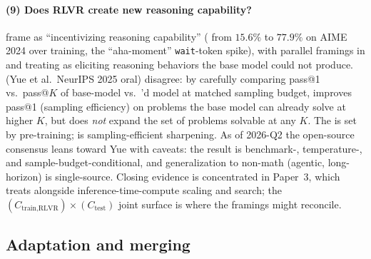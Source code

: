 \paragraph{(9) Does RLVR create new reasoning capability?}
\citet{deepseek-r1} frame  as ``incentivizing reasoning
capability'' ( from $15.6\%$ to $77.9\%$ on AIME 2024 over
 training, the ``aha-moment'' \texttt{wait}-token spike), with
parallel framings in \citet{tulu3} and \citet{qwen3} treating 
as eliciting reasoning behaviors the base model could not produce.
\citet{rlvr-limits-2025} (Yue et al.\ NeurIPS 2025 oral)%
disagree:
by carefully comparing pass@1 vs.\ pass@$K$ of base-model vs.\
'd model at matched sampling budget,  improves pass@1
(sampling efficiency) on problems the base model can already solve
at higher $K$, but does \emph{not} expand the set of problems
solvable at any $K$. The  is set by pre-training;
\glsterm{rlvr-3}{RLVR} is sampling-efficient sharpening. As of 2026-Q2 the open-source
consensus leans toward Yue with caveats: the result is benchmark-,
temperature-, and sample-budget-conditional, and generalization to
non-math (agentic, long-horizon)  is single-source. Closing
evidence is concentrated in Paper~3, which treats \glsterm{rlvr-3}{RLVR} alongside
inference-time-compute scaling and search; the
$(C_{\text{train,RLVR}}) \times (C_{\text{test}})$ joint surface is
where the framings might reconcile.

\subsection{Adaptation and merging}
\label{sec:contradictions-merge}

